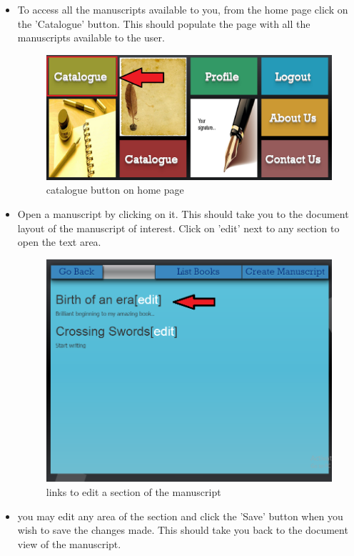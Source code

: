 	\begin{itemize}
		\item To access all the manuscripts available to you, from the home page click on the 'Catalogue' button. This should populate the page with all the manuscripts available to the user. 
		\begin{figure}[h]
			\centering
			\includegraphics[scale=0.5]{images/catalogue.png}
			\caption{catalogue button on home page}
		\end{figure} 
		
		\newpage
		\item Open a manuscript by clicking on it. This should take you to the document layout of the manuscript of interest. Click on 'edit' next to any section to open the text area.
		\begin{figure}[h]
			\centering
			\includegraphics[scale=0.5]{images/editLink.png}
			\caption{links to edit a section of the manuscript}
		\end{figure} 
		\item you may edit any area of the section and click the 'Save' button when you wish to save the changes made. This should take you back to the document view of the manuscript.
		

\end{itemize}
